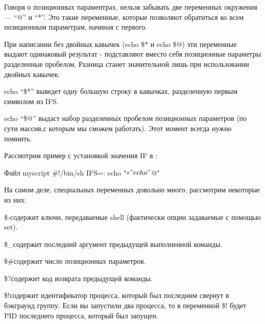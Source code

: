 Говоря о позиционных параментрах, нельзя забывать две переменных окружения ---  “@” и “*”. Это такие переменные, которые  позволяют обратиться ко всем позиционным параметрам, начиная с первого.

При написании без двойных кавычек (echo \$* и echo \$@) эти переменные выдают одинаковый результат - подставляют вместо себя позиционные параметры разделенные пробелом. Разница станет значительной лишь при использовании двойных кавычек:

echo “\$*” 	выведет одну большую строку в кавычках, разделенную первым символом из IFS.
 
echo “\$@” 	    выдаст набор разделенных пробелом позиционных параметров (по сути массив,с которым мы сможем работать). Этот момент всегда нужно помнить. 

Рассмотрим пример с установкой значения IF в :

\begin{shCode}{Файл myscript}
#!/bin/sh
IFS=:
echo "$*"
echo "$@" \end{shCode}


На самом деле, специальных переменных довольно много, рассмотрим некоторые из них:

\begin{myenv}{\$-}{содержит ключи, передаваемые shell (фактически опции задаваемые с помощью set).}
\end{myenv}

\begin{myenv}{\$\_}{содержит последний аргумент предыдущей выполненной команды.}
\end{myenv}

\begin{myenv}{\$\#}{содержит число позиционных параметров.}
\end{myenv}

\begin{myenv}{\$?}{содержит код возврата предыдущей команды.}
\end{myenv}

\begin{myenv}{\$!}{содержит идентификатор процесса, который был последним свернут в бэкграунд группу. Если вы запустили два процесса, то в переменной \$! будет PID последнего процесса, который был запущен.}
\end{myenv}
